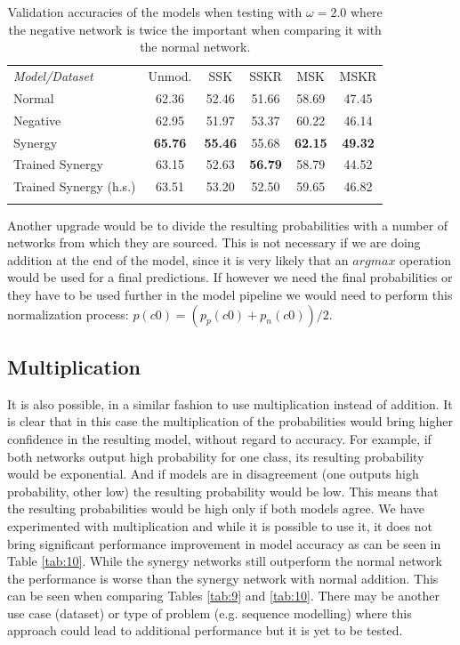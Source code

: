 \documentclass[b5paper]{book}
\begin{document}
\begin{table}
\centering
\caption{Validation accuracies of the models when testing with $\omega = 2.0$ where the negative network is twice the important when comparing it with the normal network.}
\label{tab:omega20}
\tabcolsep=0.06cm
\begin{tabular}{lccccc}
\hline\noalign{\smallskip}
\emph{Model/Dataset} & Unmod. & SSK & SSKR & MSK & MSKR \\
\noalign{\smallskip}\hline\noalign{\smallskip}
Normal & 62.36 & 52.46 & 51.66 & 58.69 & 47.45 \\
Negative & 62.95 & 51.97 & 53.37 & 60.22 & 46.14 \\
Synergy & \textbf{65.76} & \textbf{55.46} & 55.68 & \textbf{62.15} & \textbf{49.32} \\
Trained Synergy & 63.15 & 52.63 & \textbf{56.79} & 58.79 & 44.52 \\
Trained Synergy (h.s.) & 63.51 & 53.20 & 52.50 & 59.65 & 46.82 \\
\noalign{\smallskip}\hline
\end{tabular}
\end{table}



Another upgrade would be to divide the resulting probabilities with a number of networks from which they are sourced. This is not necessary if we are doing addition at the end of the model, since it is very likely that an \( argmax \) operation would be used for a final predictions. If however we need the final probabilities or they have to be used further in the model pipeline we would need to perform this normalization process: \( p(c0) = (p_p(c0) + p_n(c0)) / 2 \).

\subsection{Multiplication}

It is also possible, in a similar fashion to use multiplication instead of addition. It is clear that in this case the multiplication of the probabilities would bring higher confidence in the resulting model, without regard to accuracy. For example, if both networks output high probability for one class, its resulting probability would be exponential. And if models are in disagreement (one outputs high probability, other low) the resulting probability would be low. This means that the resulting probabilities would be high only if both models agree. We have experimented with multiplication and while it is possible to use it, it does not bring significant performance improvement in model accuracy as can be seen in Table \ref{tab:10}. While the synergy networks still outperform the normal network the performance is worse than the synergy network with normal addition. This can be seen when comparing Tables \ref{tab:9} and \ref{tab:10}. There may be another use case (dataset) or type of problem (e.g. sequence modelling) where this approach could lead to additional performance but it is yet to be tested.
\end{document}
